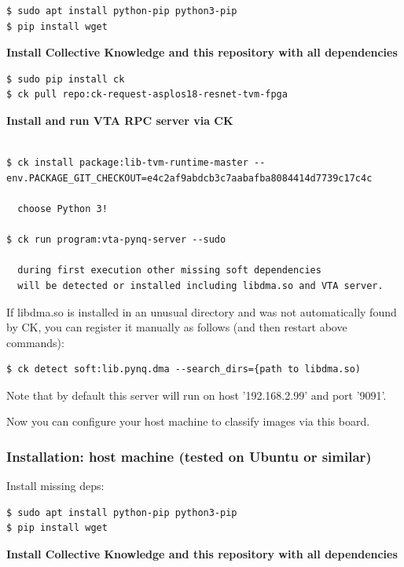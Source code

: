 \documentclass[sigconf]{acmart}
\begin{document}
\begin{verbatim}
$ sudo apt install python-pip python3-pip
$ pip install wget
\end{verbatim}

\textbf{Install Collective Knowledge and this repository with all dependencies}

\begin{verbatim}
$ sudo pip install ck
$ ck pull repo:ck-request-asplos18-resnet-tvm-fpga
\end{verbatim}

\textbf{Install and run VTA RPC server via CK}

\begin{verbatim}

$ ck install package:lib-tvm-runtime-master --env.PACKAGE_GIT_CHECKOUT=e4c2af9abdcb3c7aabafba8084414d7739c17c4c

  choose Python 3!

$ ck run program:vta-pynq-server --sudo

  during first execution other missing soft dependencies 
  will be detected or installed including libdma.so and VTA server.

\end{verbatim}

If libdma.so is installed in an unusual directory and was not automatically found by CK, 
you can register it manually as follows (and then restart above commands):

\begin{verbatim}
$ ck detect soft:lib.pynq.dma --search_dirs={path to libdma.so)
\end{verbatim}

Note that by default this server will run on host '192.168.2.99' and port '9091'.

Now you can configure your host machine to classify images via this board.

\subsubsection{Installation: host machine (tested on Ubuntu or similar)}

Install missing deps:

\begin{verbatim}
$ sudo apt install python-pip python3-pip
$ pip install wget
\end{verbatim}

\textbf{Install Collective Knowledge and this repository with all dependencies}
\end{document}
